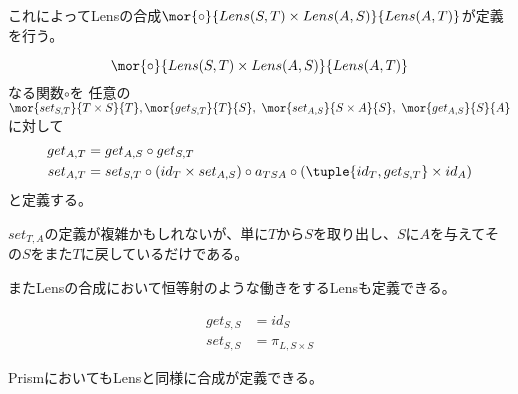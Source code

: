 \documentclass[uplatex,dvipdfmx]{jsarticle}
\begin{document}
  これによってLensの合成$\mor{\circ}{Lens(S,T)\times Lens(A,S)}{Lens(A,T)}$が定義を行う。
  \begin{define}\label{def-comp-of-lens}
    \[\mor{\circ}{Lens(S,T)\times Lens(A,S)}{Lens(A,T)}\]なる関数$\circ$を
    任意の$\mor{set_{S,T}}{T\times S}{T}, \mor{get_{S,T}}{T}{S},\ \mor{set_{A,S}}{S\times A}{S},\ \mor{get_{A,S}}{S}{A}$に対して
    \begin{align*}
      get_{A,T}&=get_{A,S}\circ get_{S,T}\\
      set_{A,T}&=set_{S,T}\circ(id_T\times set_{A,S})\circ a_{TSA}\circ(\tuple{id_T, get_{S,T}}\times id_A)
    \end{align*}
    と定義する。
    \begin{center}
    \end{center}
  \end{define}
  $set_{T,A}$の定義が複雑かもしれないが、単に$T$から$S$を取り出し、$S$に$A$を与えてその$S$をまた$T$に戻しているだけである。

  またLensの合成において恒等射のような働きをするLensも定義できる。
  \begin{define}[恒等Lens]\label{def-identity-lens}
    \begin{align*}
      get_{S,S} &= id_S\\
      set_{S,S} &= \pi_{L,S\times S}
    \end{align*}
  \end{define}
  PrismにおいてもLensと同様に合成が定義できる。
\end{document}
